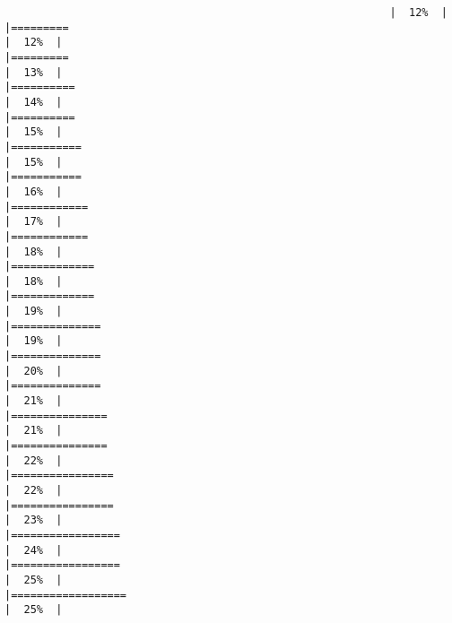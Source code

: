 \documentclass[
]{article}
\begin{document}
\begin{verbatim}
                                                            |  12%  |                                                                              |=========                                                             |  12%  |                                                                              |=========                                                             |  13%  |                                                                              |==========                                                            |  14%  |                                                                              |==========                                                            |  15%  |                                                                              |===========                                                           |  15%  |                                                                              |===========                                                           |  16%  |                                                                              |============                                                          |  17%  |                                                                              |============                                                          |  18%  |                                                                              |=============                                                         |  18%  |                                                                              |=============                                                         |  19%  |                                                                              |==============                                                        |  19%  |                                                                              |==============                                                        |  20%  |                                                                              |==============                                                        |  21%  |                                                                              |===============                                                       |  21%  |                                                                              |===============                                                       |  22%  |                                                                              |================                                                      |  22%  |                                                                              |================                                                      |  23%  |                                                                              |=================                                                     |  24%  |                                                                              |=================                                                     |  25%  |                                                                              |==================                                                    |  25%  |                                                                              
\end{verbatim}
\end{document}
